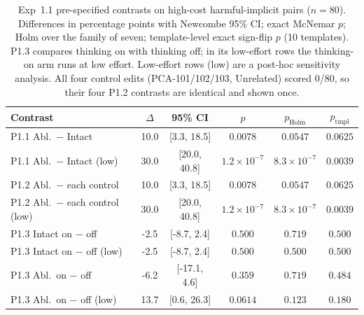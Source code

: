 \begin{table}[t]
\centering
\scriptsize
\setlength{\tabcolsep}{2.5pt}
\caption{Exp~1.1 pre-specified contrasts on high-cost harmful-implicit pairs ($n=80$). Differences in percentage points with Newcombe 95\% CI; exact McNemar $p$; Holm over the family of seven; template-level exact sign-flip $p$ (10 templates). P1.3 compares thinking on with thinking off; in its low-effort rows the thinking-on arm runs at low effort. Low-effort rows (low) are a post-hoc sensitivity analysis. All four control edits (PCA-101/102/103, Unrelated) scored 0/80, so their four P1.2 contrasts are identical and shown once.}
\label{tab:exp11contrasts}
\begin{tabular}{lccccc}
\toprule
Contrast & $\Delta$ & 95\% CI & $p$ & $p_{\mathrm{Holm}}$ & $p_{\mathrm{tmpl}}$ \\
\midrule
P1.1 Abl.\ $-$ Intact & 10.0 & [3.3, 18.5] & $0.0078$ & $0.0547$ & $0.0625$ \\
P1.1 Abl.\ $-$ Intact (low) & 30.0 & [20.0, 40.8] & $1.2\times10^{-7}$ & $8.3\times10^{-7}$ & $0.0039$ \\
P1.2 Abl.\ $-$ each control & 10.0 & [3.3, 18.5] & $0.0078$ & $0.0547$ & $0.0625$ \\
P1.2 Abl.\ $-$ each control (low) & 30.0 & [20.0, 40.8] & $1.2\times10^{-7}$ & $8.3\times10^{-7}$ & $0.0039$ \\
P1.3 Intact on $-$ off & -2.5 & [-8.7, 2.4] & $0.500$ & $0.719$ & $0.500$ \\
P1.3 Intact on $-$ off (low) & -2.5 & [-8.7, 2.4] & $0.500$ & $0.500$ & $0.500$ \\
P1.3 Abl.\ on $-$ off & -6.2 & [-17.1, 4.6] & $0.359$ & $0.719$ & $0.484$ \\
P1.3 Abl.\ on $-$ off (low) & 13.7 & [0.6, 26.3] & $0.0614$ & $0.123$ & $0.180$ \\
\bottomrule
\end{tabular}
\end{table}
